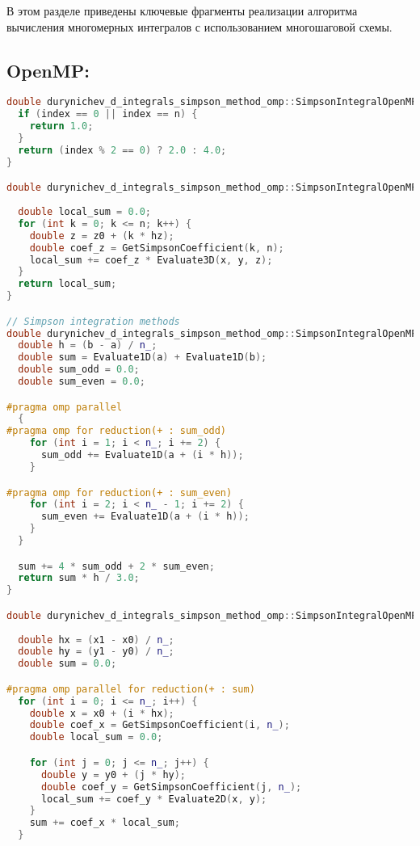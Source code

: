 \documentclass[12pt]{article}
\begin{document}
В этом разделе приведены ключевые фрагменты реализации алгоритма вычисления многомерных интегралов с использованием многошаговой схемы.

\subsection*{OpenMP:}
\begin{lstlisting}[language=C++]
double durynichev_d_integrals_simpson_method_omp::SimpsonIntegralOpenMP::GetSimpsonCoefficient(int index, int n) {
  if (index == 0 || index == n) {
    return 1.0;
  }
  return (index % 2 == 0) ? 2.0 : 4.0;
}

double durynichev_d_integrals_simpson_method_omp::SimpsonIntegralOpenMP::ComputeZIntegral(double x, double y, double z0,
                                                                                          double z1, int n, double hz) {
  double local_sum = 0.0;
  for (int k = 0; k <= n; k++) {
    double z = z0 + (k * hz);
    double coef_z = GetSimpsonCoefficient(k, n);
    local_sum += coef_z * Evaluate3D(x, y, z);
  }
  return local_sum;
}

// Simpson integration methods
double durynichev_d_integrals_simpson_method_omp::SimpsonIntegralOpenMP::Simpson1D(double a, double b) const {
  double h = (b - a) / n_;
  double sum = Evaluate1D(a) + Evaluate1D(b);
  double sum_odd = 0.0;
  double sum_even = 0.0;

#pragma omp parallel
  {
#pragma omp for reduction(+ : sum_odd)
    for (int i = 1; i < n_; i += 2) {
      sum_odd += Evaluate1D(a + (i * h));
    }

#pragma omp for reduction(+ : sum_even)
    for (int i = 2; i < n_ - 1; i += 2) {
      sum_even += Evaluate1D(a + (i * h));
    }
  }

  sum += 4 * sum_odd + 2 * sum_even;
  return sum * h / 3.0;
}

double durynichev_d_integrals_simpson_method_omp::SimpsonIntegralOpenMP::Simpson2D(double x0, double x1, double y0,
                                                                                   double y1) {
  double hx = (x1 - x0) / n_;
  double hy = (y1 - y0) / n_;
  double sum = 0.0;

#pragma omp parallel for reduction(+ : sum)
  for (int i = 0; i <= n_; i++) {
    double x = x0 + (i * hx);
    double coef_x = GetSimpsonCoefficient(i, n_);
    double local_sum = 0.0;

    for (int j = 0; j <= n_; j++) {
      double y = y0 + (j * hy);
      double coef_y = GetSimpsonCoefficient(j, n_);
      local_sum += coef_y * Evaluate2D(x, y);
    }
    sum += coef_x * local_sum;
  }


\end{lstlisting}
\end{document}
